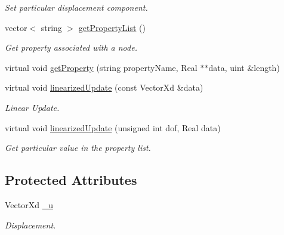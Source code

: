 \begin{DoxyCompactItemize}
\begin{DoxyCompactList}\small\item\em Set particular displacement component. \item\end{DoxyCompactList}\item 
\hypertarget{classvoom_1_1_mechanics_node_ab0b75691ef53b93cee4c8ecad35e1567}{
vector$<$ string $>$ \hyperlink{classvoom_1_1_mechanics_node_ab0b75691ef53b93cee4c8ecad35e1567}{getPropertyList} ()}
\label{classvoom_1_1_mechanics_node_ab0b75691ef53b93cee4c8ecad35e1567}

\begin{DoxyCompactList}\small\item\em Get property associated with a node. \item\end{DoxyCompactList}\item 
virtual void \hyperlink{classvoom_1_1_mechanics_node_a921fd1f238a85727c87f1f2833d222ab}{getProperty} (string propertyName, Real $\ast$$\ast$data, uint \&length)
\item 
\hypertarget{classvoom_1_1_mechanics_node_aa533aac405cd9f4b8b024ad070f18aff}{
virtual void \hyperlink{classvoom_1_1_mechanics_node_aa533aac405cd9f4b8b024ad070f18aff}{linearizedUpdate} (const VectorXd \&data)}
\label{classvoom_1_1_mechanics_node_aa533aac405cd9f4b8b024ad070f18aff}

\begin{DoxyCompactList}\small\item\em Linear Update. \item\end{DoxyCompactList}\item 
\hypertarget{classvoom_1_1_mechanics_node_a5d88b444511972760e066843ae0d67f6}{
virtual void \hyperlink{classvoom_1_1_mechanics_node_a5d88b444511972760e066843ae0d67f6}{linearizedUpdate} (unsigned int dof, Real data)}
\label{classvoom_1_1_mechanics_node_a5d88b444511972760e066843ae0d67f6}

\begin{DoxyCompactList}\small\item\em Get particular value in the property list. \item\end{DoxyCompactList}\end{DoxyCompactItemize}
\subsection*{Protected Attributes}
\begin{DoxyCompactItemize}
\item 
\hypertarget{classvoom_1_1_mechanics_node_af2040114c8fa1aa72396e08ddda1cf8e}{
VectorXd \hyperlink{classvoom_1_1_mechanics_node_af2040114c8fa1aa72396e08ddda1cf8e}{\_\-u}}
\label{classvoom_1_1_mechanics_node_af2040114c8fa1aa72396e08ddda1cf8e}

\begin{DoxyCompactList}\small\item\em Displacement. \item\end{DoxyCompactList}\end{DoxyCompactItemize}


